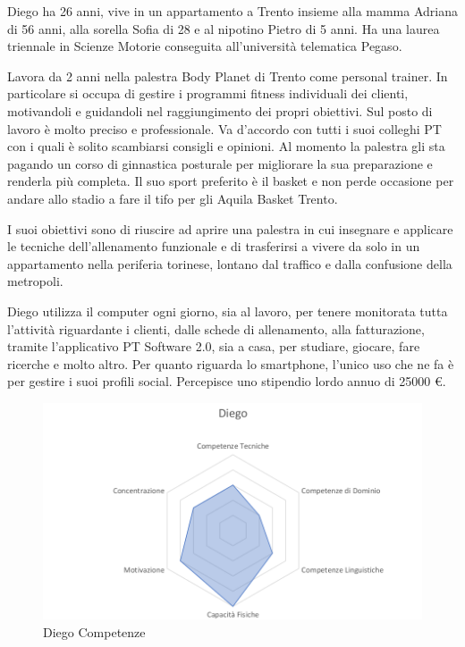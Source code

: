 \documentclass[12pt,italian,]{report}
\begin{document}
Diego ha 26 anni, vive in un appartamento a Trento insieme alla mamma
Adriana di 56 anni, alla sorella Sofia di 28 e al nipotino Pietro di 5
anni. Ha una laurea triennale in Scienze Motorie conseguita
all'università telematica Pegaso.

Lavora da 2 anni nella palestra Body Planet di Trento come personal
trainer. In particolare si occupa di gestire i programmi fitness
individuali dei clienti, motivandoli e guidandoli nel raggiungimento dei
propri obiettivi. Sul posto di lavoro è molto preciso e professionale.
Va d'accordo con tutti i suoi colleghi PT con i quali è solito
scambiarsi consigli e opinioni. Al momento la palestra gli sta pagando
un corso di ginnastica posturale per migliorare la sua preparazione e
renderla più completa. Il suo sport preferito è il basket e non perde
occasione per andare allo stadio a fare il tifo per gli Aquila Basket
Trento.

I suoi obiettivi sono di riuscire ad aprire una palestra in cui
insegnare e applicare le tecniche dell'allenamento funzionale e di
trasferirsi a vivere da solo in un appartamento nella periferia
torinese, lontano dal traffico e dalla confusione della metropoli.

Diego utilizza il computer ogni giorno, sia al lavoro, per tenere
monitorata tutta l'attività riguardante i clienti, dalle schede di
allenamento, alla fatturazione, tramite l'applicativo PT Software 2.0,
sia a casa, per studiare, giocare, fare ricerche e molto altro. Per
quanto riguarda lo smartphone, l'unico uso che ne fa è per gestire i
suoi profili social. Percepisce uno stipendio lordo annuo di 25000 €.

\begin{figure}[h]
\centering
\includegraphics{img/diego_competenze.png}
\caption{Diego Competenze}
\end{figure}
\end{document}
